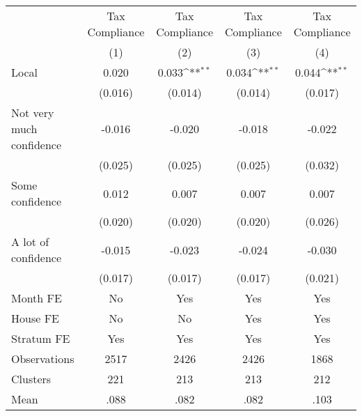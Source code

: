 {
\def\sym#1{\ifmmode^{#1}\else\(^{#1}\)\fi}
\begin{tabular}{l*{4}{c}}
\toprule
                &\multicolumn{1}{c}{Tax Compliance}&\multicolumn{1}{c}{Tax Compliance}&\multicolumn{1}{c}{Tax Compliance}&\multicolumn{1}{c}{Tax Compliance}\\
                &\multicolumn{1}{c}{(1)}         &\multicolumn{1}{c}{(2)}         &\multicolumn{1}{c}{(3)}         &\multicolumn{1}{c}{(4)}         \\
\midrule
Local           &    0.020         &    0.033\sym{**} &    0.034\sym{**} &    0.044\sym{**} \\
                &  (0.016)         &  (0.014)         &  (0.014)         &  (0.017)         \\
Not very much confidence&   -0.016         &   -0.020         &   -0.018         &   -0.022         \\
                &  (0.025)         &  (0.025)         &  (0.025)         &  (0.032)         \\
Some confidence &    0.012         &    0.007         &    0.007         &    0.007         \\
                &  (0.020)         &  (0.020)         &  (0.020)         &  (0.026)         \\
A lot of confidence&   -0.015         &   -0.023         &   -0.024         &   -0.030         \\
                &  (0.017)         &  (0.017)         &  (0.017)         &  (0.021)         \\
Month FE        &       No         &      Yes         &      Yes         &      Yes         \\
House FE        &       No         &       No         &      Yes         &      Yes         \\
Stratum FE      &      Yes         &      Yes         &      Yes         &      Yes         \\
\midrule
Observations    &     2517         &     2426         &     2426         &     1868         \\
Clusters        &      221         &      213         &      213         &      212         \\
Mean            &     .088         &     .082         &     .082         &     .103         \\
\bottomrule
\end{tabular}
}
